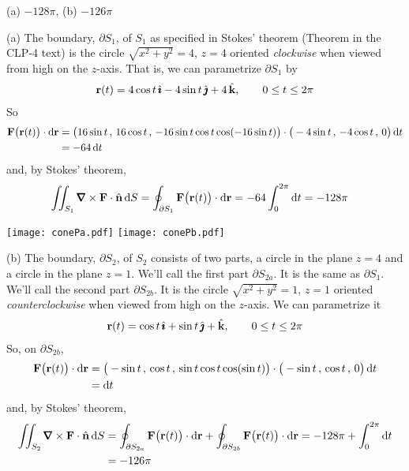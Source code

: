
\begin{answer} 
(a) $-128\pi$,\qquad
(b) $-126\pi$
\end{answer}


\begin{solution}
 (a)
The boundary, $\partial S_1$, of $S_1$ as specified in Stokes' theorem (Theorem
 in the CLP-4 text) is the circle
$\sqrt{x^2+y^2}=4$, $z=4$ oriented \emph{clockwise} when viewed from high on
the $z$-axis. That is, we can parametrize $\partial S_1$ by
\begin{align*}
\mathbf{r}(t) = 4\cos t\,\hat{\pmb{\imath}} -4\sin t\,\hat{\pmb{\jmath}} +4\,\hat{\mathbf{k}},\qquad 0\le t\le 2\pi
\end{align*} 
So
\begin{align*}
\mathbf{F}\big(\mathbf{r}(t)\big)\cdot\mathrm{d}\mathbf{r}
&= \big(16\sin t \,,\, 16\cos t \,,\, -16\sin t\cos t \cos(-16\sin t)  \big)
      \cdot
   \big(-4\sin t \,,\, -4\cos t \,,\, 0\big)\,\mathrm{d}t \\
&= -64\,\mathrm{d}t
\end{align*}
and, by Stokes' theorem,
\begin{align*}
\dblInt_{S_1} \vnabla\times\vF \cdot \hn\,\dee{S}
&= \oint_{\partial S_1} \vF\big(\vr(t)\big)\cdot\dee{\vr}
= -64 \int_0^{2\pi} \dee{t}
=-128\pi
\end{align*}

\begin{center}
       \texttt{[image: conePa.pdf]}\qquad\qquad
       \texttt{[image: conePb.pdf]}
\end{center}


\noindent (b)
The boundary, $\partial S_2$, of $S_2$ consists of two parts,
a circle in the plane $z=4$ and a circle in the plane $z=1$.
We'll call the first part $\partial S_{2a}$. It is the same as
$\partial S_1$. We'll call the second part $\partial S_{2b}$.
It is the circle $\sqrt{x^2+y^2}=1$, $z=1$ oriented \emph{counterclockwise} 
when viewed from high on the $z$-axis. 
We can parametrize it
\begin{align*}
\mathbf{r}(t) = \cos t\,\hat{\pmb{\imath}} +\sin t\,\hat{\pmb{\jmath}} + \hat{\mathbf{k}},\qquad 0\le t\le 2\pi
\end{align*} 
So, on $\partial S_{2b}$,
\begin{align*}
\mathbf{F}\big(\mathbf{r}(t)\big)\cdot\mathrm{d}\mathbf{r}
&= \big(-\sin t \,,\, \cos t \,,\, \sin t\cos t \cos(\sin t)  \big)
      \cdot
   \big(-\sin t \,,\, \cos t \,,\, 0\big)\,\mathrm{d}t \\
&= \mathrm{d}t
\end{align*}
and, by Stokes' theorem,
\begin{align*}
\dblInt_{S_2} \vnabla\times\vF \cdot \hn\,\dee{S}
&= \oint_{\partial S_{2a}} \vF\big(\vr(t)\big)\cdot\dee{\vr}
   +\oint_{\partial S_{2b}} \vF\big(\vr(t)\big)\cdot\dee{\vr}
= -128\pi +  \int_0^{2\pi} \dee{t} \\
&=-126\pi
\end{align*}
\end{solution}

